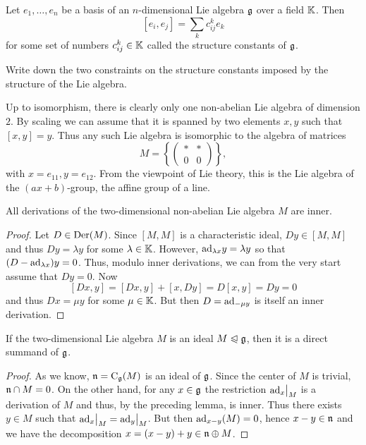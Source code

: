 \begin{defn}
    Let $e_1,\ldots,e_n$ be a basis of an $n$-dimensional Lie algebra $\mathfrak{g}$ over a field $\mathbb{K}$. Then
    \[[e_i,e_j]=\sum_k c_{ij}^k e_k\]
    for some set of numbers $c_{ij}^k\in\mathbb{K}$ called the structure constants of $\mathfrak{g}$.
\end{defn}

\begin{xca}
    Write down the two constraints on the structure constants imposed by the structure of the Lie algebra.
\end{xca}

\begin{example}
    Up to isomorphism, there is clearly only one non-abelian Lie algebra of dimension $2$. By scaling we can assume that it is spanned by two elements $x,y$ such that $[x,y]=y$. Thus any such Lie algebra is isomorphic to the algebra of matrices 
    \[M=\left\{\begin{pmatrix}
        \ast &\ast \\
        0&0
    \end{pmatrix}\right\},\]
    with $x=e_{11}, y=e_{12}$. From the viewpoint of Lie theory, this is the Lie algebra of the $(ax+b)$-group, the affine group of a line.
\end{example}

\begin{lem}
    All derivations of the two-dimensional non-abelian Lie algebra $M$ are inner.
\end{lem}
\begin{proof}
    Let $D\in\operatorname{Der}(M)$. Since $[M,M]$ is a characteristic ideal, $Dy\in[M,M]$ and thus $Dy=\lambda y$ for some $\lambda\in\mathbb{K}$. However, $\mathrm{ad}_{\lambda x}y=\lambda y$ so that $(D-\mathrm{ad}_{\lambda x})y=0$. Thus, modulo inner derivations, we can from the very start assume that $Dy=0$. Now
    \[[Dx,y]=[Dx,y]+[x,Dy]=D[x,y]=Dy=0\]
    and thus $Dx=\mu y$ for some $\mu\in\mathbb{K}$. But then $D=\mathrm{ad}_{-\mu y}$ is itself an inner derivation.
\end{proof}

\begin{lem}\label{lem 2}
    If the two-dimensional Lie algebra $M$ is an ideal $M\trianglelefteqslant \mathfrak{g}$, then it is a direct summand of $\mathfrak{g}$.
\end{lem}
\begin{proof}
    As we know, $\mathfrak{n}=\mathrm{C}_{\mathfrak{g}}(M)$ is an ideal of $\mathfrak{g}$. Since the center of $M$ is trivial, $\mathfrak{n}\cap M=0$. On the other hand, for any $x\in\mathfrak{g}$ the restriction $\restr{\ad_x}{M}$ is a derivation of $M$ and thus, by the preceding lemma, is inner. Thus there exists $y\in M$ such that $\restr{\ad_x}{M}=\restr{\ad_y}{M}$. But then $\mathrm{ad}_{x-y}(M)=0$, hence $x-y\in \mathfrak{n}$ and we have the decomposition $x=(x-y)+y\in \mathfrak{n}\oplus M$.
\end{proof}


